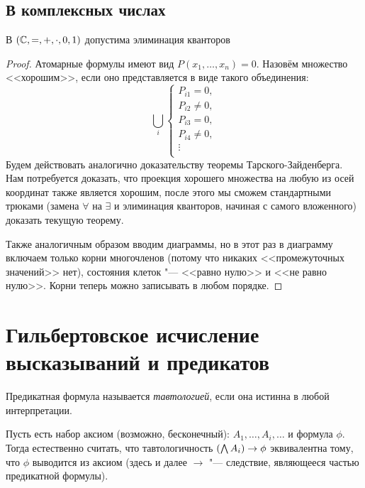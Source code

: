 \subsection{В комплексных числах}
\begin{theorem}
	В $(\mathbb{C}, =, +, \cdot, 0, 1)$ допустима элиминация кванторов
\end{theorem}
\begin{proof}
	Атомарные формулы имеют вид $P(x_1, \dots, x_n)=0$.
	Назовём множество <<хорошим>>, если оно представляется в виде такого объединения:
	\[
		\bigcup_i
			\begin{cases}
				P_{i1} = 0, \\
				P_{i2} \neq 0, \\
				P_{i3} = 0, \\
				P_{i4} \neq 0, \\
				\vdots \\
			\end{cases}
	\]
	Будем действовать аналогично доказательству теоремы Тарского-Зайденберга.
	Нам потребуется доказать, что проекция хорошего множества на любую из осей координат также является хорошим,
	после этого мы сможем стандартными трюками (замена $\forall$ на $\exists$ и элиминация кванторов, начиная с самого вложенного)
	доказать текущую теорему.

	Также аналогичным образом вводим диаграммы, но в этот раз в диаграмму включаем только корни многочленов (потому что никаких <<промежуточных значений>> нет),
	состояния клеток "--- <<равно нулю>> и <<не равно нулю>>.
	Корни теперь можно записывать в любом порядке.
	\TODO
\end{proof}

\section{Гильбертовское исчисление высказываний и предикатов}
\begin{Def}
	Предикатная формула называется \textsl{тавтологией}, если она истинна в любой интерпретации.
\end{Def}
\begin{Rem} %
	Пусть есть набор аксиом (возможно, бесконечный): $A_1, \dots, A_i, \dots$ и формула $\phi$.
	Тогда естественно считать, что тавтологичность $(\bigwedge A_i) \to \phi$ эквивалентна тому, что $\phi$ выводится из аксиом (здесь и далее $\to$ "--- следствие, являющееся частью предикатной формулы).
\end{Rem}

